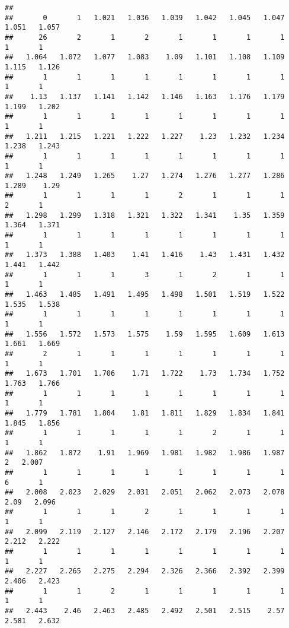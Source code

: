 \documentclass[]{article}
\begin{document}
\begin{verbatim}
## 
##       0       1   1.021   1.036   1.039   1.042   1.045   1.047   1.051   1.057 
##      26       2       1       2       1       1       1       1       1       1 
##   1.064   1.072   1.077   1.083    1.09   1.101   1.108   1.109   1.115   1.126 
##       1       1       1       1       1       1       1       1       1       1 
##    1.13   1.137   1.141   1.142   1.146   1.163   1.176   1.179   1.199   1.202 
##       1       1       1       1       1       1       1       1       1       1 
##   1.211   1.215   1.221   1.222   1.227    1.23   1.232   1.234   1.238   1.243 
##       1       1       1       1       1       1       1       1       1       1 
##   1.248   1.249   1.265    1.27   1.274   1.276   1.277   1.286   1.289    1.29 
##       1       1       1       1       2       1       1       1       2       1 
##   1.298   1.299   1.318   1.321   1.322   1.341    1.35   1.359   1.364   1.371 
##       1       1       1       1       1       1       1       1       1       1 
##   1.373   1.388   1.403    1.41   1.416    1.43   1.431   1.432   1.441   1.442 
##       1       1       1       3       1       2       1       1       1       1 
##   1.463   1.485   1.491   1.495   1.498   1.501   1.519   1.522   1.535   1.538 
##       1       1       1       1       1       1       1       1       1       1 
##   1.556   1.572   1.573   1.575    1.59   1.595   1.609   1.613   1.661   1.669 
##       2       1       1       1       1       1       1       1       1       1 
##   1.673   1.701   1.706    1.71   1.722    1.73   1.734   1.752   1.763   1.766 
##       1       1       1       1       1       1       1       1       1       1 
##   1.779   1.781   1.804    1.81   1.811   1.829   1.834   1.841   1.845   1.856 
##       1       1       1       1       1       2       1       1       1       1 
##   1.862   1.872    1.91   1.969   1.981   1.982   1.986   1.987       2   2.007 
##       1       1       1       1       1       1       1       1       6       1 
##   2.008   2.023   2.029   2.031   2.051   2.062   2.073   2.078    2.09   2.096 
##       1       1       1       2       1       1       1       1       1       1 
##   2.099   2.119   2.127   2.146   2.172   2.179   2.196   2.207   2.212   2.222 
##       1       1       1       1       1       1       1       1       1       1 
##   2.227   2.265   2.275   2.294   2.326   2.366   2.392   2.399   2.406   2.423 
##       1       1       2       1       1       1       1       1       1       1 
##   2.443    2.46   2.463   2.485   2.492   2.501   2.515    2.57   2.581   2.632 

\end{verbatim}
\end{document}
